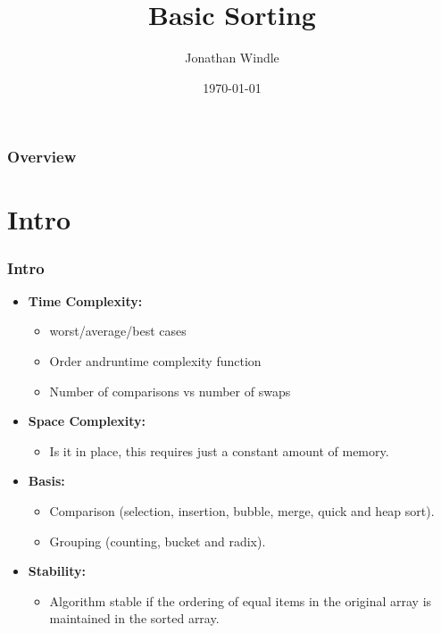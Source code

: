 \documentclass{beamer}
\title[Basic Sorting]{Basic Sorting} %
\author{Jonathan Windle} %
\institute[UEA] %
{
University of East Anglia \\ %
\medskip
\textit{J.Windle@uea.ac.uk} %
}
\date{\today} %
\begin{document}
\begin{frame}
\titlepage %
\end{frame}

\begin{frame}[allowframebreaks]
\frametitle{Overview} %
\tableofcontents %
\end{frame} 

\section{Intro}
\begin{frame}
\frametitle{Intro}
\begin{itemize}
\item \textbf{Time Complexity:}
\begin{itemize}
\item worst/average/best cases
\item Order andruntime complexity function
\item Number of comparisons vs number of swaps
\end{itemize}
\item \textbf{Space Complexity:}
\begin{itemize}
\item Is it in {\color{red}place}, this requires just a constant amount of memory.
\end{itemize}
\item \textbf{Basis:}
\begin{itemize}
\item Comparison (selection, insertion, bubble, merge, quick and heap sort).
\item Grouping (counting, bucket and radix).
\end{itemize}
\item \textbf{Stability:}
\begin{itemize}
\item Algorithm stable if the ordering of equal items in the original array is maintained in the sorted array.
\end{itemize}
\end{itemize}
\end{frame}
\end{document}
